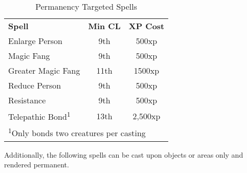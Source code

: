 \begin{table}[htb]
\caption{Permanency Targeted Spells}
\centering
\begin{tabular}{l c c}
\textbf{Spell} & \textbf{Min CL} & \textbf{XP Cost}\\
Enlarge Person & 9th & 500xp\\
Magic Fang & 9th & 500xp\\
Greater Magic Fang & 11th & 1500xp\\
Reduce Person & 9th & 500xp\\
Resistance & 9th & 500xp\\
Telepathic Bond\textsuperscript{1} & 13th & 2,500xp\\
\multicolumn{3}{l}{\textsuperscript{1}Only bonds two creatures per casting}
\end{tabular}
\end{table}


Additionally, the following spells can be cast upon objects or areas only and rendered 
permanent.

